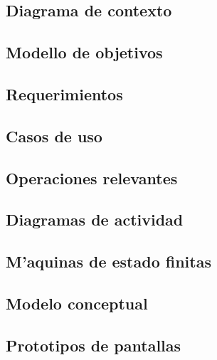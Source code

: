 \subsection{Diagrama de contexto}
\subsection{Modello de objetivos}
\subsection{Requerimientos}

\subsection{Casos de uso}


\subsection{Operaciones relevantes}
\subsection{Diagramas de actividad}
\subsection{M'aquinas de estado finitas}
\subsection{Modelo conceptual}
\subsection{Prototipos de pantallas}
